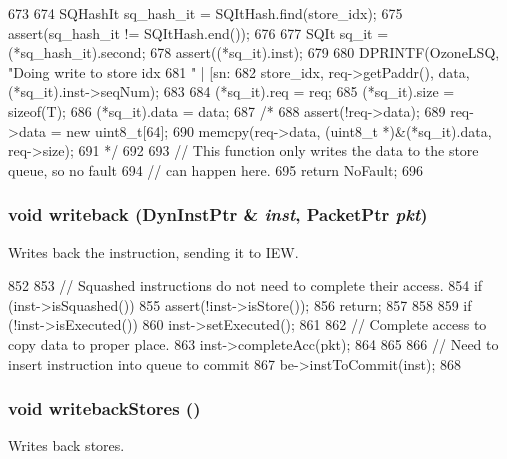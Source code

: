 \begin{DoxyCode}
673 {
674     SQHashIt sq_hash_it = SQItHash.find(store_idx);
675     assert(sq_hash_it != SQItHash.end());
676 
677     SQIt sq_it = (*sq_hash_it).second;
678     assert((*sq_it).inst);
679 
680     DPRINTF(OzoneLSQ, "Doing write to store idx %
681             " | [sn:%
682             store_idx, req->getPaddr(), data, (*sq_it).inst->seqNum);
683 
684     (*sq_it).req = req;
685     (*sq_it).size = sizeof(T);
686     (*sq_it).data = data;
687 /*
688     assert(!req->data);
689     req->data = new uint8_t[64];
690     memcpy(req->data, (uint8_t *)&(*sq_it).data, req->size);
691 */
692 
693     // This function only writes the data to the store queue, so no fault
694     // can happen here.
695     return NoFault;
696 }
\end{DoxyCode}
\hypertarget{classOzoneLWLSQ_a3911bacb8817c31cfbeefd125dba0217}{
\subsubsection[{writeback}]{\setlength{\rightskip}{0pt plus 5cm}void writeback ({\bf DynInstPtr} \& {\em inst}, \/  {\bf PacketPtr} {\em pkt})}}
\label{classOzoneLWLSQ_a3911bacb8817c31cfbeefd125dba0217}
Writes back the instruction, sending it to IEW. 


\begin{DoxyCode}
852 {
853     // Squashed instructions do not need to complete their access.
854     if (inst->isSquashed()) {
855         assert(!inst->isStore());
856         return;
857     }
858 
859     if (!inst->isExecuted()) {
860         inst->setExecuted();
861 
862         // Complete access to copy data to proper place.
863         inst->completeAcc(pkt);
864     }
865 
866     // Need to insert instruction into queue to commit
867     be->instToCommit(inst);
868 }
\end{DoxyCode}
\hypertarget{classOzoneLWLSQ_a5f04e29d6f6feb8b86460491f2ba7547}{
\subsubsection[{writebackStores}]{\setlength{\rightskip}{0pt plus 5cm}void writebackStores ()}}
\label{classOzoneLWLSQ_a5f04e29d6f6feb8b86460491f2ba7547}
Writes back stores. 


